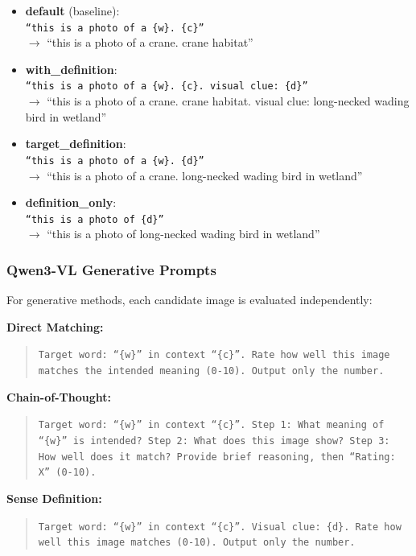 \documentclass[11pt]{article}
\begin{document}
\begin{itemize}
    \item \textbf{default} (baseline): \\ \texttt{``this is a photo of a \{w\}. \{c\}''} \\ $\rightarrow$ ``this is a photo of a crane. crane habitat''

    \item \textbf{with\_definition}: \\ \texttt{``this is a photo of a \{w\}. \{c\}. visual clue: \{d\}''} \\ $\rightarrow$ ``this is a photo of a crane. crane habitat. visual clue: long-necked wading bird in wetland''

    \item \textbf{target\_definition}: \\ \texttt{``this is a photo of a \{w\}. \{d\}''} \\ $\rightarrow$ ``this is a photo of a crane. long-necked wading bird in wetland''

    \item \textbf{definition\_only}: \\ \texttt{``this is a photo of \{d\}''} \\ $\rightarrow$ ``this is a photo of long-necked wading bird in wetland''
\end{itemize}

\subsubsection{Qwen3-VL Generative Prompts}

For generative methods, each candidate image is evaluated independently:

\textbf{Direct Matching:}
\begin{quote}
\small
\texttt{Target word: ``\{w\}'' in context ``\{c\}''. Rate how well this image matches the intended meaning (0-10). Output only the number.}
\end{quote}

\textbf{Chain-of-Thought:}
\begin{quote}
\small
\texttt{Target word: ``\{w\}'' in context ``\{c\}''. Step 1: What meaning of ``\{w\}'' is intended? Step 2: What does this image show? Step 3: How well does it match? Provide brief reasoning, then ``Rating: X'' (0-10).}
\end{quote}

\textbf{Sense Definition:}
\begin{quote}
\small
\texttt{Target word: ``\{w\}'' in context ``\{c\}''. Visual clue: \{d\}. Rate how well this image matches (0-10). Output only the number.}
\end{quote}
\end{document}
